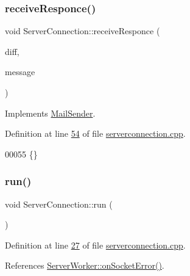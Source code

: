 \subsubsection{\texorpdfstring{receive\+Responce()}{receiveResponce()}}
{\footnotesize\ttfamily void Server\+Connection\+::receive\+Responce (\begin{DoxyParamCaption}\item[{\hyperlink{a00190}{Diff\+Card} $\ast$}]{diff,  }\item[{\hyperlink{a00166}{Message\+For\+Server} $\ast$}]{message }\end{DoxyParamCaption})\hspace{0.3cm}{\ttfamily [virtual]}}



Implements \hyperlink{a00162_a1ac02b696f81c3b3e9e5226574b1b135}{Mail\+Sender}.



Definition at line \hyperlink{a00128_source_l00054}{54} of file \hyperlink{a00128_source}{serverconnection.\+cpp}.


\begin{DoxyCode}
00055                                                                   \{\}
\end{DoxyCode}
\mbox{\label{a00238_ac7f219a30789e91afa079ab5e49529bd}} 
\subsubsection{\texorpdfstring{run()}{run()}}
{\footnotesize\ttfamily void Server\+Connection\+::run (\begin{DoxyParamCaption}{ }\end{DoxyParamCaption})\hspace{0.3cm}{\ttfamily [protected]}}



Definition at line \hyperlink{a00128_source_l00027}{27} of file \hyperlink{a00128_source}{serverconnection.\+cpp}.



References \hyperlink{a00134_source_l00048}{Server\+Worker\+::on\+Socket\+Error()}.


